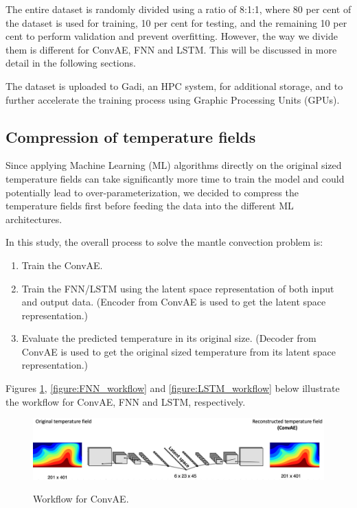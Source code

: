 The entire dataset is randomly divided using a ratio of 8:1:1, where 80 per cent of the dataset is used for training, 10 per cent for testing, and the remaining 10 per cent to perform validation and prevent overfitting. However, the way we divide them is different for ConvAE, FNN and LSTM. This will be discussed in more detail in the following sections.

The dataset is uploaded to Gadi, an HPC system, for additional storage, and to further accelerate the training process using Graphic Processing Units (GPUs). 

\subsection{Compression of temperature fields}

Since applying Machine Learning (ML) algorithms directly on the original sized temperature fields can take significantly more time to train the model and could potentially lead to over-parameterization, we decided to compress the temperature fields first before feeding the data into the different ML architectures.

In this study, the overall process to solve the mantle convection problem is: 
\begin{enumerate}
  \item Train the ConvAE.
  \item Train the FNN/LSTM using the latent space representation of both input and output data. (Encoder from ConvAE is used to get the latent space representation.)
  \item Evaluate the predicted temperature in its original size. (Decoder from ConvAE is used to get the original sized temperature from its latent space representation.)
\end{enumerate}

Figures \ref{figure:ConvAE_workflow}, \ref{figure:FNN_workflow} and \ref{figure:LSTM_workflow} 
below illustrate the workflow for ConvAE, FNN and LSTM, respectively.

\begin{figure}[H]
    \centering
    \caption{Workflow for ConvAE.}
    \includegraphics[scale=0.3]{figures/mantle_convection_images/ConvAE_workflow.png}
    \label{figure:ConvAE_workflow}
\end{figure}

